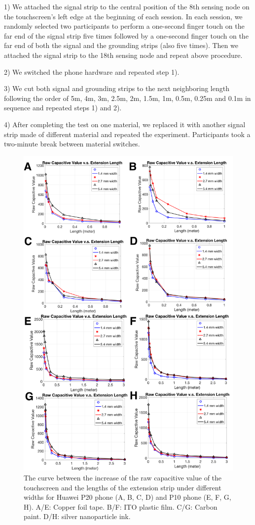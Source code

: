 1) We attached the signal strip to the central position of the 8th sensing node on the touchscreen's left edge at the beginning of each session. In each session, we randomly selected two participants to perform a one-second finger touch on the far end of the signal strip five times followed by a one-second finger touch on the far end of both the signal and the grounding strips (also five times). Then we attached the signal strip to the 18th sensing node and repeat above procedure. 

2) We switched the phone hardware and repeated step 1).

3) We cut both signal and grounding strips to the next neighboring length following the order of 5m, 4m, 3m, 2.5m, 2m, 1.5m, 1m, 0.5m, 0.25m and 0.1m in sequence and repeated steps 1) and 2).

4) After completing the test on one material, we replaced it with another signal strip made of different material and repeated the experiment. Participants took a two-minute break between material switches.

\begin{figure}[ht]
	\centering
	  \includegraphics[width=0.75\columnwidth]{figures/length.png}
	  \caption{The curve between the increase of the raw capacitive value of the touchscreen and the lengths of the extension strip under different widths for Huawei P20 phone (A, B, C, D) and P10 phone (E, F, G, H). A/E: Copper foil tape. B/F: ITO plastic film. C/G: Carbon paint. D/H: silver nanoparticle ink.}
	  \label{fig:length}
\end{figure}


